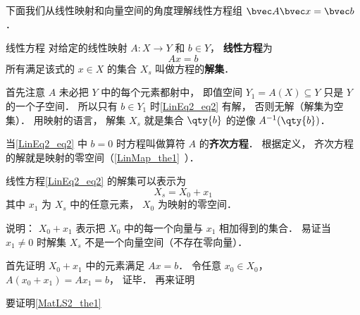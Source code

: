 

下面我们从线性映射和向量空间的角度理解线性方程组 $\bvec A \bvec x = \bvec b$．


\begin{definition}{线性方程}
对给定的线性映射 $A:X\to Y$ 和 $b \in Y$， \textbf{线性方程}为
\begin{equation}\label{LinEq2_eq2}
Ax = b
\end{equation}
所有满足该式的 $x \in X$ 的集合 $X_s$ 叫做方程的\textbf{解集}．
\end{definition}

首先注意 $A$ 未必把 $Y$ 中的每个元素都射中， 即值空间 $Y_1 = A(X) \subseteq Y$ 只是 $Y$ 的一个子空间． 所以只有 $b \in Y_1$ 时\autoref{LinEq2_eq2} 有解， 否则无解（解集为空集）． 用映射的语言， 解集 $X_s$ 就是集合 $\qty{b}$ 的逆像 $A^{-1}(\qty{b})$．

当\autoref{LinEq2_eq2} 中 $b = 0$ 时方程叫做算符 $A$ 的\textbf{齐次方程}． 根据定义， 齐次方程的解就是映射的零空间（\autoref{LinMap_the1}~）．

\begin{theorem}{}
线性方程\autoref{LinEq2_eq2} 的解集可以表示为
\begin{equation}\label{LinEq2_eq1}
X_s = X_0 + x_1
\end{equation}
其中 $x_1$ 为 $X_s$ 中的任意元素，  $X_0$ 为映射的零空间．
\end{theorem}
说明： $X_0 + x_1$ 表示把 $X_0$ 中的每一个向量与 $x_1$ 相加得到的集合． 易证当 $x_1 \ne 0$ 时解集 $X_s$ 不是一个向量空间（不存在零向量）．

首先证明 $X_0 + x_1$ 中的元素满足 $Ax = b$． 令任意 $x_0 \in X_0$， $A(x_0 + x_1) = Ax_1 = b$， 证毕． 再来证明

要证明\autoref{MatLS2_the1}~
